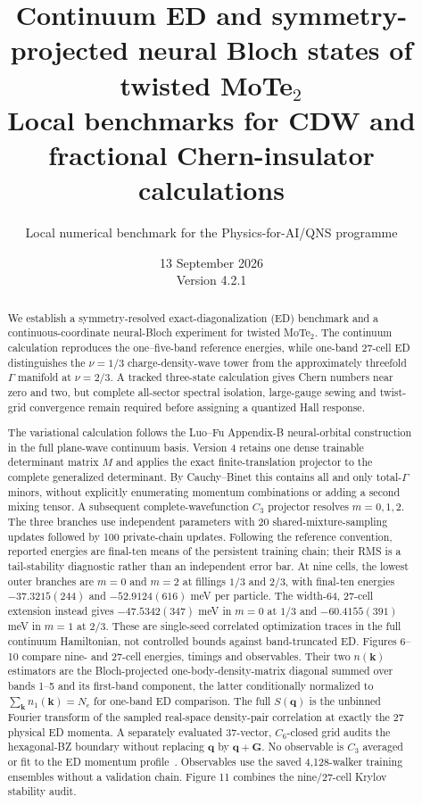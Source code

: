 \documentclass[10pt,twocolumn]{article}
\title{Continuum ED and symmetry-projected neural Bloch states of twisted MoTe$_2$\\
\large Local benchmarks for CDW and fractional Chern-insulator calculations}
\author{Local numerical benchmark for the Physics-for-AI/QNS programme}
\date{13 September 2026\\Version 4.2.1}
\begin{document}
\maketitle

\begin{abstract}
We establish a symmetry-resolved exact-diagonalization (ED) benchmark and a
continuous-coordinate neural-Bloch experiment for twisted MoTe$_2$.  The
continuum calculation reproduces the one--five-band reference energies, while
one-band 27-cell ED distinguishes the $\nu=1/3$ charge-density-wave tower from
the approximately threefold $\Gamma$ manifold at $\nu=2/3$.  A tracked
three-state calculation gives Chern numbers near zero and two, but complete
all-sector spectral isolation, large-gauge sewing and twist-grid convergence
remain required before assigning a quantized Hall response.

The variational calculation follows the Luo--Fu Appendix-B neural-orbital
construction in the full plane-wave continuum basis. Version 4 retains one
dense trainable determinant matrix $M$ and applies the exact finite-translation
projector to the complete generalized determinant. By Cauchy--Binet this
contains all and only total-$\Gamma$ minors, without explicitly enumerating
momentum combinations or adding a second mixing tensor. A subsequent
complete-wavefunction $C_3$ projector resolves $m=0,1,2$. The three branches
use independent parameters with 20 shared-mixture-sampling updates followed
by 100 private-chain updates. Following the reference convention, reported
energies are final-ten means of the persistent training chain; their RMS is a
tail-stability diagnostic rather than an independent error bar. At nine cells,
the lowest outer branches are $m=0$ and $m=2$ at fillings $1/3$ and $2/3$,
with final-ten energies $-37.3215(244)$ and $-52.9124(616)$ meV per particle.
The width-64, 27-cell extension instead gives $-47.5342(347)$ meV in $m=0$
at $1/3$ and $-60.4155(391)$ meV in $m=1$ at $2/3$. These are single-seed
correlated optimization traces in the full continuum Hamiltonian, not
controlled bounds against band-truncated ED. Figures 6--10 compare nine- and
27-cell energies, timings and observables. Their two $n(\bm k)$ estimators are
the Bloch-projected one-body-density-matrix diagonal summed over bands 1--5
and its first-band component, the latter conditionally normalized to
$\sum_{\bm k}n_1(\bm k)=N_e$ for one-band ED comparison. The full $S(\bm q)$
is the unbinned Fourier transform of the sampled real-space density-pair
correlation at exactly the 27 physical ED momenta. A separately evaluated
37-vector, $C_6$-closed grid audits the hexagonal-BZ boundary without replacing
$\bm q$ by $\bm q+\bm G$. No observable is $C_3$ averaged or fit to the ED
momentum profile~\cite{luo,limomentum}. Observables use
the saved 4,128-walker training ensembles without a validation chain. Figure 11 combines the
nine/27-cell Krylov stability audit.
\end{abstract}
\end{document}
